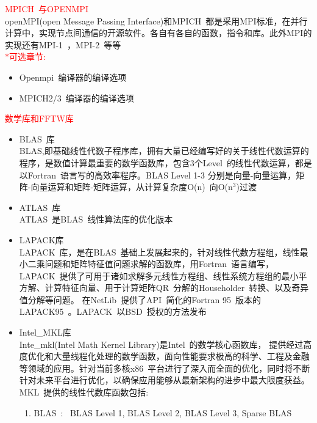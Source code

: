 \documentclass{article}      %
\begin{document}
\textcolor{red}{\textrm{MPICH~}与\textrm{OPENMPI~}}\\
\textrm{openMPI(open Message Passing Interface)}和\textrm{MPICH~}都是采用MPI标准，在并行计算中，实现节点间通信的开源软件。各自有各自的函数，指令和库。此外MPI的实现还有\textrm{MPI-1~}，\textrm{MPI-2~}等等\\
\textcolor{red}{$\ast$可选章节:~}
\begin{itemize}
	\item Openmpi~编译器的编译选项
	\item MPICH2/3~编译器的编译选项
\end{itemize}
\textcolor{red}{数学库和FFTW库}\\
\begin{itemize}
	\item \textrm{BLAS~}库\\
		\textrm{BLAS},即基础线性代数子程序库，拥有大量已经编写好的关于线性代数运算的程序，是数值计算最重要的数学函数库，包含3个\textrm{Level~}的线性代数运算，都是以\textrm{Fortran~}语言写的高效率程序。\textrm{BLAS Level 1-3} 分别是向量-向量运算，矩阵-向量运算和矩阵-矩阵运算，从计算复杂度\textrm{O(n)~}向\textrm{O(n$^3$)}过渡
	\item \textrm{ATLAS~}库\\
		\textrm{ATLAS~}是\textrm{BLAS~}线性算法库的优化版本
	\item \textrm{LAPACK}库\\
		\textrm{LAPACK~}库，是在\textrm{BLAS~}基础上发展起来的，针对线性代数方程组，线性最小二乘问题和矩阵特征值问题求解的函数库，用\textrm{Fortran~}语言编写，\textrm{LAPACK~}提供了可用于诸如求解多元线性方程组、线性系统方程组的最小平方解、计算特征向量、用于计算矩阵\textrm{QR~}分解的\textrm{Householder~}转换、以及奇异值分解等问题。 在\textrm{NetLib~}提供了\textrm{API~}简化的\textrm{Fortran 95~}版本的\textrm{LAPACK95~}。\textrm{LAPACK~}以\textrm{BSD~}授权的方法发布
	\item \textrm{Intel\_MKL}库\\
		\textrm{Inte\_mkl(Intel Math Kernel Library)}是\textrm{Intel~}的数学核心函数库， 提供经过高度优化和大量线程化处理的数学函数，面向性能要求极高的科学、工程及金融等领域的应用。针对当前多核\textrm{x86~}平台进行了深入而全面的优化，同时将不断针对未来平台进行优化，以确保应用能够从最新架构的进步中最大限度获益。\\
		\textrm{MKL~}提供的线性代数库函数包括:\\
		\begin{enumerate}
			\item \textrm{BLAS~}:~  \textrm{BLAS Level 1, BLAS Level 2, BLAS Level 3, Sparse BLAS}

\end{enumerate}
\end{itemize}
\end{document}
